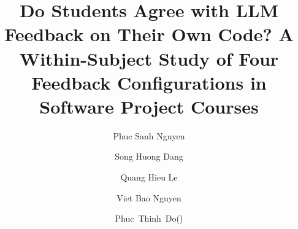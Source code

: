\documentclass{llncs}
\begin{document}
\title{Do Students Agree with LLM Feedback on Their Own Code? A Within-Subject Study of Four Feedback Configurations in Software Project Courses}


\author{
    Phuc Sanh Nguyen \and
    Song Huong Dang \and
    Quang Hieu Le \and
    Viet Bao Nguyen \and
    \mbox{Phuc Thinh Do(\Envelope)}
}



\maketitle %
\end{document}
